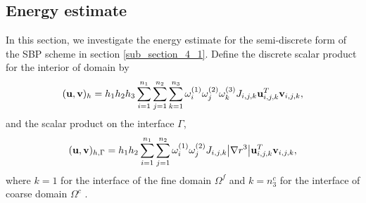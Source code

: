 \documentclass[a4paper]{article}
\begin{document}
\subsection{Energy estimate}


In this section, we investigate the energy estimate for the semi-discrete form of the SBP scheme in section \ref{sub_section_4_1}. Define the discrete scalar product for the interior of domain by
\begin{equation}\label{scalar_product_discrete_interior}
({\bf u}, {\bf v})_h = h_1h_2h_3\sum_{i=1}^{n_1}\sum_{j=1}^{n_2}\sum_{k=1}^{n_3}\omega_i^{(1)}\omega_j^{(2)}\omega_k^{(3)}J_{i,j,k}{\bf u}^{T}_{i,j,k}{\bf v}_{i,j,k},
\end{equation}
and the scalar product on the interface $\Gamma$,
\begin{equation}\label{scalar_product_discrete_interface}
({\bf u}, {\bf v})_{h,\Gamma} = h_1h_2\sum_{i=1}^{n_1}\sum_{j=1}^{n_2}\omega_i^{(1)}\omega_j^{(2)}J_{i,j,k}\big|\nabla r^{3}\big|{\bf u}_{i,j,k}^{T}{\bf v}_{i,j,k},
\end{equation}
where $k = 1$ for the interface of the fine domain $\Omega^f$ and $k = n_3^c$ for the interface of coarse domain $\Omega^c$ .
\end{document}
